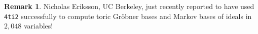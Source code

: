 \documentclass[12pt]{article}
\newcommand\Command{\begingroup \urlstyle{sf}\Url}
\theoremstyle{definition}
\newtheorem*{Remark}{Remark}
\newcommand{\important}{\textbf}
\newcommand{\FourTiTwo}{{\tt 4ti2}}
\begin{document}
\begin{Remark}
  Nicholas Eriksson, UC Berkeley, just recently reported to
  have used \FourTiTwo{} successfully to compute toric Gr\"obner bases
  and Markov bases of ideals in $2,048$ variables!
\end{Remark}













\begin{comment}

\section{Release Information}

\subsection{Platform and Memory Requirements}

The binaries for \FourTiTwo{} v1.1 are available for (Sun machines and
for) platforms that run Linux. They were compiled using \Command{gcc}
version 2.96. This or a higher version of \Command{gcc} is needed to
run \FourTiTwo{}. The memory requirements are essentially problem
dependent and they can easily exceed 1GB of RAM for tough problems.





\subsection{File Descriptions} 
The Linux release of \FourTiTwo{}, version 1.1, consists of a single
archive file, 
\[
\important{4ti2\_linux\_v1.1.tar.gz},
\]
that contains the following files:
 

\end{comment}
\end{document}
